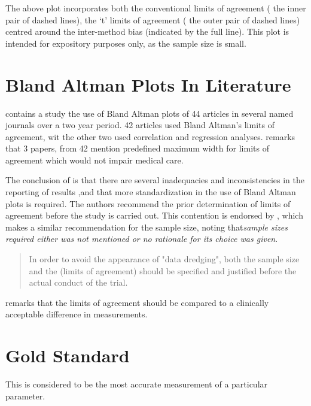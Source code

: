 \documentclass[12pt, a4paper]{report}
\theoremstyle{plain}
\theoremstyle{definition}
\theoremstyle{remark}
\begin{document}
	The above plot incorporates both the conventional limits of
	agreement ( the inner pair of dashed lines), the `t' limits of
	agreement ( the outer pair of dashed lines) centred around the
	inter-method bias (indicated by the full line). This plot is
	intended for expository purposes only, as the sample size is
	small.
	
	
	
	
	

	\section{Bland Altman Plots In Literature}
	\citet{mantha} contains a study the use of Bland Altman plots of
	44 articles in several named journals over a two year period. 42
	articles used Bland Altman's limits of agreement, wit the other
	two used correlation and regression analyses. \citet{mantha}
	remarks that 3 papers, from 42 mention predefined maximum width
	for limits of agreement which would not impair medical care.
	
	The conclusion of \citet{mantha} is that there are several
	inadequacies and inconsistencies in the reporting of results ,and
	that more standardization in the use of Bland Altman plots is
	required. The authors recommend the prior determination of limits
	of agreement before the study is carried out. This contention is
	endorsed by \citet{lin}, which makes a similar recommendation for
	the sample size, noting that\emph{sample sizes required either was
		not mentioned or no rationale for its choice was given}.
	
	\begin{quote}
		In order to avoid the appearance of "data dredging", both the
		sample size and the (limits of agreement) should be specified and
		justified before the actual conduct of the trial. \citep{lin}
	\end{quote}
	
	\citet{Dewitte} remarks that the limits of agreement should be
	compared to a clinically acceptable difference in measurements.
	
	
	\section{Gold Standard} This is considered to be the most
	accurate measurement of a particular parameter.
\end{document}

